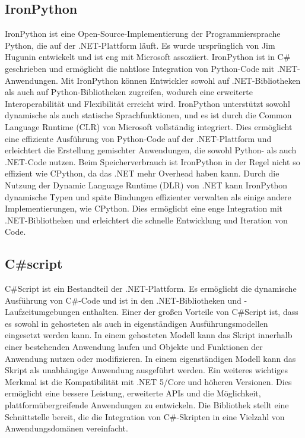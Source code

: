 \subsection{IronPython}
IronPython ist eine Open-Source-Implementierung der Programmiersprache Python, die auf der .NET-Plattform läuft. Es wurde ursprünglich von Jim Hugunin entwickelt und ist eng mit Microsoft assoziiert. IronPython ist in C\# geschrieben und ermöglicht die nahtlose Integration von Python-Code mit .NET-Anwendungen. Mit IronPython können Entwickler sowohl auf .NET-Bibliotheken als auch auf Python-Bibliotheken zugreifen, wodurch eine erweiterte Interoperabilität und Flexibilität erreicht wird.
IronPython unterstützt sowohl dynamische als auch statische Sprachfunktionen, und es ist durch die Common Language Runtime (CLR) von Microsoft vollständig integriert. Dies ermöglicht eine effiziente Ausführung von Python-Code auf der .NET-Plattform und erleichtert die Erstellung gemischter Anwendungen, die sowohl Python- als auch .NET-Code nutzen.
Beim Speicherverbrauch ist IronPython in der Regel nicht so effizient wie CPython, da das .NET mehr Overhead haben kann. 
Durch die Nutzung der Dynamic Language Runtime (DLR) von .NET kann IronPython dynamische Typen und späte Bindungen effizienter verwalten als einige andere Implementierungen, wie CPython. 
Dies ermöglicht eine enge Integration mit .NET-Bibliotheken und erleichtert die schnelle Entwicklung und Iteration von Code.
\cite{ironPython} \cite{ironPythonGithub} \cite{ironPythonInAction}
 
\newpage
\subsection{C\#script}
C\#Script ist ein Bestandteil der .NET-Plattform. Es ermöglicht die dynamische Ausführung von C\#-Code und ist in den .NET-Bibliotheken und -Laufzeitumgebungen enthalten. 
Einer der großen Vorteile von C\#Script ist, dass es sowohl in gehosteten als auch in eigenständigen Ausführungsmodellen eingesetzt werden kann. 
In einem gehosteten Modell kann das Skript innerhalb einer bestehenden Anwendung laufen und Objekte und Funktionen der Anwendung nutzen oder modifizieren. 
In einem eigenständigen Modell kann das Skript als unabhängige Anwendung ausgeführt werden. 
Ein weiteres wichtiges Merkmal ist die Kompatibilität mit .NET 5/Core und höheren Versionen. 
Dies ermöglicht eine bessere Leistung, erweiterte APIs und die Möglichkeit, plattformübergreifende Anwendungen zu entwickeln. 
Die Bibliothek stellt eine  Schnittstelle bereit, die die Integration von C\#-Skripten in eine Vielzahl von Anwendungsdomänen vereinfacht.


